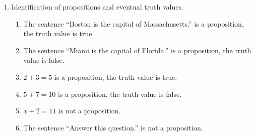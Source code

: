 \documentclass{report}
\begin{document}
\begin{enumerate}[label=\textbf{\arabic*}] 
	\item Identification of propositions and eventual truth values.  
  \begin{enumerate}[label=\textbf{\alph*)}]
    \item The sentence ``Boston is the capital of Massachusetts.'' is a proposition, the truth value is true.
    \item The sentence ``Miami is the capital of Florida.'' is a proposition, the truth value is false.
    \item $ 2 + 3 = 5 $ is a proposition, the truth value is true.  
    \item $ 5 + 7 = 10 $ is a proposition, the truth value is false.
    \item $ x + 2 = 11 $ is not a proposition.
    \item The sentence ``Answer this question.'' is not a proposition. 
  \end{enumerate}
\end{enumerate}
\end{document}
